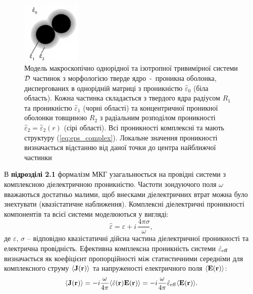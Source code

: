 \documentclass[twoside,a4paper,14pt]{vakaref-utf8}
\begin{document}
\begin{figure}
	\centering
	\includegraphics[width=0.25\textwidth]{particles-pen2.PNG}
	\caption{\label{fig:model-1layer}Модель макроскопічно однорідної та ізотропної тривимірної системи $\cal{D}$ частинок з морфологією тверде ядро~-~проникна оболонка, диспергованих в однорідній матриці з проникністю $\hat{\varepsilon}_0$ (біла область). Кожна частинка складається з твердого ядра радіусом $R_1$ та проникністю $\hat{\varepsilon}_1$ (чорні області) та концентричної проникної оболонки товщиною $R_2$ з радіальним розподілом проникності $\hat{\varepsilon}_2 = \hat{\varepsilon}_2(r)$ (сірі області). Всі проникності комплексні та мають структуру (\ref{eq:eps_complex}). Локальне значення проникності визначається відстанню від даної точки до центра найближчої частинки\vspace{-15pt}}
\end{figure}

В {\bf підрозділі 2.1} формалізм МКГ \cite{Sushko2007, Sushko2009, SushkoJPD2009, Sushko2017} узагальнюється на провідні системи з комплексною діелектричною проникністю. Частоти зондуючого поля $\omega$ вважаються достатньо малими, щоб внесками діелектричних втрат можна було знехтувати (квазістатичне наближення). Комплексні діелектричні проникності компонентів та всієї системи моделюються у вигляді:
\begin{equation}\label{eq:eps_complex}
\hat{\varepsilon} = \varepsilon + i\,\frac{4\pi\sigma}{\omega},
\end{equation}
де $\varepsilon$, $\sigma$ -- відповідно квазістатичні дійсна частина діелектричної проникності та електрична провідність. Ефективна комплексна проникність системи $\hat{\varepsilon}_{\rm eff}$ визначається як коефіцієнт пропорційності між статистичними середніми для комплексного струму $\langle {\bf J} ({\bf r}) \rangle$ та напруженості електричного поля $\langle {\bf E}({\bf r}) \rangle$:
\begin{equation}\label{eq:eff_complex}
\langle {\bf{J}} ({\bf{r}})\rangle =
-i\frac{\omega}{4\pi}\langle \hat{\varepsilon} ({\bf{r}}) {\bf{E}}
({\bf{r}}) \rangle = -i\frac{\omega}{4\pi} \hat{\varepsilon}_{\rm
	eff} \langle {\bf{E}} ({\bf{r}}) \rangle.
\end{equation}
\end{document}
